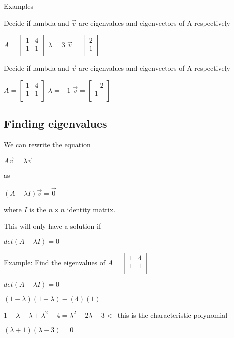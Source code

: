 \documentclass{extarticle}
\begin{document}
\begin{multicols}{4}
Examples

Decide if lambda and $\vec{v}$ are eigenvalues and eigenvectors of A respectively

$A=\left[\begin{matrix}1&4\\1&1\\\end{matrix}\right]$	$\lambda=3$	$\vec{v}=\left[\begin{matrix}2\\1\\\end{matrix}\right]$

Decide if lambda and $\vec{v}$ are eigenvalues and eigenvectors of A respectively

$A=\left[\begin{matrix}1&4\\1&1\\\end{matrix}\right]$	$\lambda=-1$	$\vec{v}=\left[\begin{matrix}-2\\1\\\end{matrix}\right]$



\subsection{Finding eigenvalues}
We can rewrite the equation

$A\vec{v}=\lambda\vec{v}$

as

$\left(A-\lambda I\right)\vec{v}=\vec{0}$

where $I$ is the $n\times n$ identity matrix.

This will only have a solution if

$det\left(A-\lambda I\right)=0$

Example: Find the eigenvalues of $A=\left[\begin{matrix}1&4\\1&1\\\end{matrix}\right]$

$det\left(A-\lambda I\right)=0$

$(1-\lambda)(1-\lambda)-(4)(1)$

$1-\lambda-\lambda+\lambda^2-4=\lambda^2-2\lambda-3$ <-- this is the characteristic polynomial

$(\lambda+1)(\lambda-3)=0$


\end{multicols}
\end{document}
